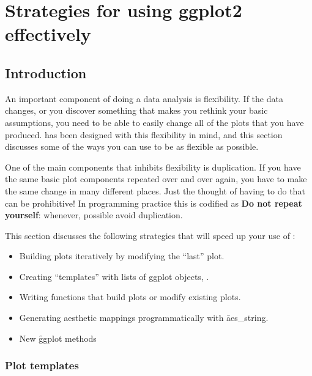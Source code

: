 

\chapter{Strategies for using ggplot2 effectively}

\section{Introduction}

An important component of doing a data analysis is flexibility.  If the data changes, or you discover something that makes you rethink your basic assumptions, you need to be able to easily change all of the plots that you have produced.  \ggplot has been designed with this flexibility in mind, and this section discusses some of the ways you can use \ggplot to be as flexible as possible.

One of the main components that inhibits flexibility is duplication. If you have the same basic plot components repeated over and over again, you have to make the same change in many different places.  Just the thought of having to do that can be prohibitive!  In programming practice this is codified as {\bf Do not repeat yourself}: whenever, possible avoid duplication.

This section discusses the following strategies that will speed up your use of \ggplot:

\begin{itemize}
  \item Building plots iteratively by modifying the ``last'' plot.

  \item Creating ``templates'' with lists of ggplot objects, .

  \item Writing functions that build plots or modify existing plots.

  \item Generating aesthetic mappings programmatically with \f{aes_string}.

  \item New \f{ggplot} methods

\end{itemize}

\subsection{Plot templates}
\label{sub:plot_templates}

